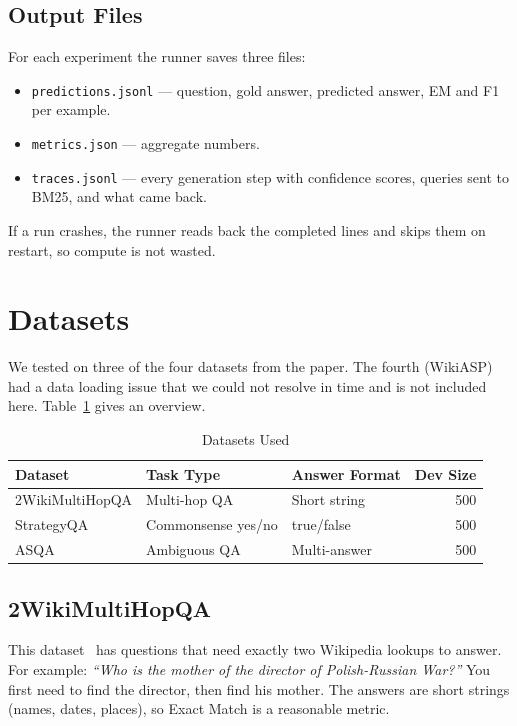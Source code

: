 \documentclass[conference]{IEEEtran}
\begin{document}
\subsection{Output Files}

For each experiment the runner saves three files:
\begin{itemize}[leftmargin=*]
  \item \texttt{predictions.jsonl} — question, gold answer, predicted
    answer, EM and F1 per example.
  \item \texttt{metrics.json} — aggregate numbers.
  \item \texttt{traces.jsonl} — every generation step with confidence
    scores, queries sent to BM25, and what came back.
\end{itemize}
If a run crashes, the runner reads back the completed lines and skips
them on restart, so compute is not wasted.

\section{Datasets}
\label{sec:datasets}

We tested on three of the four datasets from the paper. The fourth
(WikiASP) had a data loading issue that we could not resolve in time
and is not included here. Table~\ref{tab:datasets} gives an overview.

\begin{table}[htbp]
\caption{Datasets Used}
\label{tab:datasets}
\centering
\begin{tabular}{p{2.0cm}p{1.8cm}p{1.5cm}r}
\toprule
\textbf{Dataset} & \textbf{Task Type} & \textbf{Answer Format} & \textbf{Dev Size} \\
\midrule
2WikiMultiHopQA & Multi-hop QA        & Short string  & 500 \\
StrategyQA      & Commonsense yes/no  & true/false    & 500 \\
ASQA            & Ambiguous QA        & Multi-answer  & 500 \\
\bottomrule
\end{tabular}
\end{table}

\subsection{2WikiMultiHopQA}
This dataset~\cite{ho2020constructing} has questions that need
exactly two Wikipedia lookups to answer. For example:
\emph{``Who is the mother of the director of Polish-Russian War?''}
You first need to find the director, then find his mother. The
answers are short strings (names, dates, places), so Exact Match
is a reasonable metric.
\end{document}
